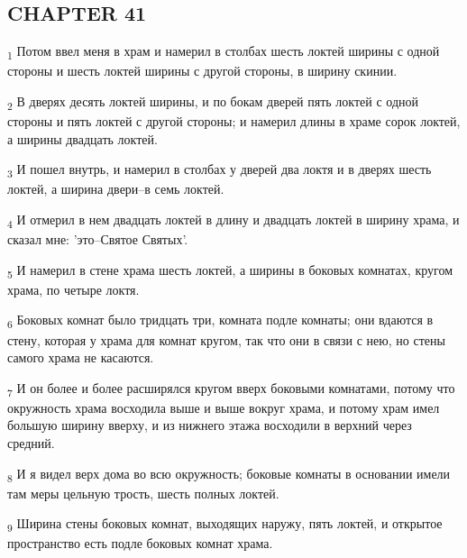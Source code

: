 \subsection{CHAPTER 41}
\begin{tcolorbox}
\textsubscript{1} Потом ввел меня в храм и намерил в столбах шесть локтей ширины с одной стороны и шесть локтей ширины с другой стороны, в ширину скинии.
\end{tcolorbox}
\begin{tcolorbox}
\textsubscript{2} В дверях десять локтей ширины, и по бокам дверей пять локтей с одной стороны и пять локтей с другой стороны; и намерил длины в храме сорок локтей, а ширины двадцать локтей.
\end{tcolorbox}
\begin{tcolorbox}
\textsubscript{3} И пошел внутрь, и намерил в столбах у дверей два локтя и в дверях шесть локтей, а ширина двери--в семь локтей.
\end{tcolorbox}
\begin{tcolorbox}
\textsubscript{4} И отмерил в нем двадцать локтей в длину и двадцать локтей в ширину храма, и сказал мне: 'это--Святое Святых'.
\end{tcolorbox}
\begin{tcolorbox}
\textsubscript{5} И намерил в стене храма шесть локтей, а ширины в боковых комнатах, кругом храма, по четыре локтя.
\end{tcolorbox}
\begin{tcolorbox}
\textsubscript{6} Боковых комнат было тридцать три, комната подле комнаты; они вдаются в стену, которая у храма для комнат кругом, так что они в связи с нею, но стены самого храма не касаются.
\end{tcolorbox}
\begin{tcolorbox}
\textsubscript{7} И он более и более расширялся кругом вверх боковыми комнатами, потому что окружность храма восходила выше и выше вокруг храма, и потому храм имел большую ширину вверху, и из нижнего этажа восходили в верхний через средний.
\end{tcolorbox}
\begin{tcolorbox}
\textsubscript{8} И я видел верх дома во всю окружность; боковые комнаты в основании имели там меры цельную трость, шесть полных локтей.
\end{tcolorbox}
\begin{tcolorbox}
\textsubscript{9} Ширина стены боковых комнат, выходящих наружу, пять локтей, и открытое пространство есть подле боковых комнат храма.
\end{tcolorbox}

